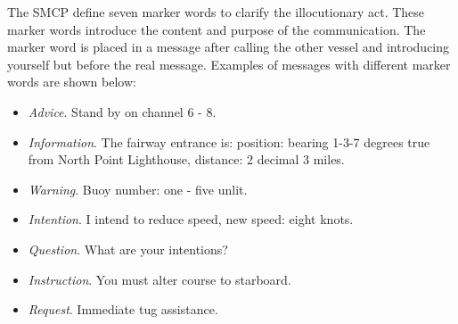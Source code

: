The \ac{SMCP} define seven marker words to clarify the illocutionary act. These marker words introduce the content and purpose of the communication. The marker word is placed in a message after calling the other vessel and introducing yourself but before the real message. Examples of messages with different marker words are shown below:
\begin{itemize}
	\item \emph{Advice}. Stand by on channel 6 - 8.
	\item \emph{Information}. The fairway entrance is: position: bearing 1-3-7 degrees true from North Point Lighthouse, distance: 2 decimal 3 miles.
	\item \emph{Warning}. Buoy number: one - five unlit.
	\item \emph{Intention}. I intend to reduce speed, new speed: eight knots.
	\item \emph{Question}. What are your intentions?
	\item \emph{Instruction}. You must alter course to starboard.
	\item \emph{Request}. Immediate tug assistance.
\end{itemize}
